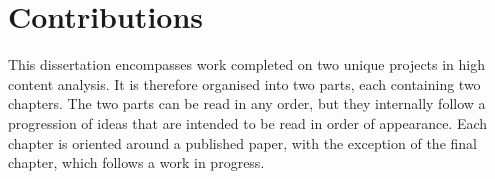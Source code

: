 %
%
%
%

\section{Contributions}

This dissertation encompasses work completed on two unique projects in high content analysis. It is therefore organised into two parts, each containing two chapters. The two parts can be read in any order, but they internally follow a progression of ideas that are intended to be read in order of appearance. Each chapter is oriented around a published paper, with the exception of the final chapter, which follows a work in progress.

